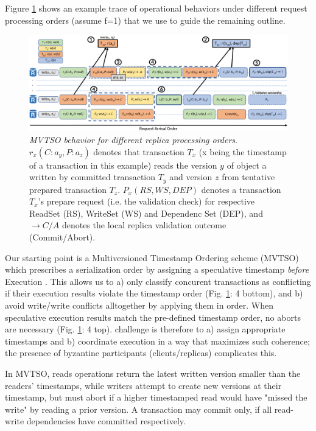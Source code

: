 Figure \ref{fig:MVTSOEX} shows an example trace of \sys operational behaviors under different request processing orders (assume f=1) that we use to guide the remaining outline.

\begin{figure}
\begin{center}
\includegraphics[width= \textwidth]{./figures/MVTSOLargeFont.png}
\end{center}
\caption{\emph{MVTSO behavior for different replica processing orders}. $r_x(C : a_y ,P : a_z)$ denotes that transaction $T_x$ (x being the timestamp of a transaction in this example) reads the version $y$ of object a written by committed transaction $T_y$ and version $z$ from tentative prepared transaction $T_z$. $P_x(RS,WS,DEP)$ denotes a transaction $T_x$'s prepare request (i.e. the validation check) for respective ReadSet (RS), WriteSet (WS) and Dependenc Set (DEP), and $\rightarrow C / A$ denotes the local replica validation outcome (Commit/Abort).} 
\label{fig:MVTSOEX}
\end{figure}

Our starting point is a Multiversioned Timestamp Ordering scheme (MVTSO) which prescribes a serialization order by assigning a speculative timestamp \textit{before} Execution \cite{bernstein1983multiversion, reed1983implementing, su2017tebaldi}. This allows us to a) only classify concurent transactions as conflicting if their execution results violate the timestamp order (Fig. \ref{fig:MVTSOEX}: 4 bottom), and b) avoid write/write conflicts alltogether by applying them in order. 
When speculative execution results match the pre-defined timestamp order, no aborts are necessary (Fig. \ref{fig:MVTSOEX}: 4 top). \sys challenge is therefore to a) assign appropriate timestamps and b) coordinate execution in a way that maximizes such coherence; the presence of byzantine participants (clients/replicas) complicates this.


In MVTSO, reads operations return the latest written version smaller than the readers' timestamps, while writers attempt to create new versions at their timestamp, but must abort if a higher timestamped read would have "missed the write" by reading a prior version. A transaction may commit only, if all read-write dependencies have committed respectively.

